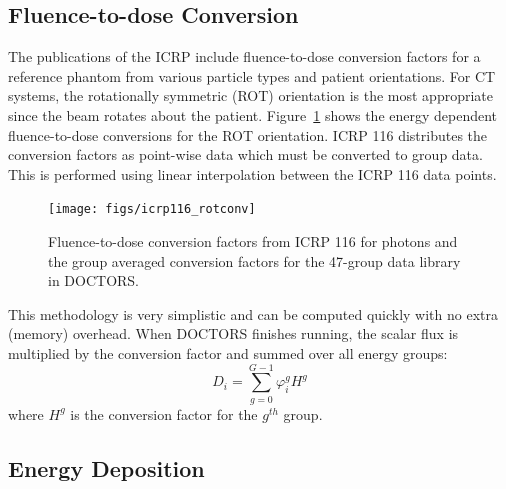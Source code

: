 \subsection{Fluence-to-dose Conversion}

The publications of the ICRP include fluence-to-dose conversion factors for a reference phantom from various particle types and patient orientations. For CT systems, the rotationally symmetric (ROT) orientation is the most appropriate since the beam rotates about the patient. Figure~\ref{fig:icrp116_rotconv} shows the energy dependent fluence-to-dose conversions for the ROT orientation. ICRP 116 distributes the conversion factors as point-wise data which must be converted to group data. This is performed using linear interpolation between the ICRP 116 data points.

\begin{figure}[tb]
  \begin{center}
   \texttt{[image: figs/icrp116\_rotconv]}
  \end{center}
  \caption{Fluence-to-dose conversion factors from ICRP 116 for photons and the group averaged conversion factors for the 47-group data library in DOCTORS.}
\label{fig:icrp116_rotconv}
\end{figure}

This methodology is very simplistic and can be computed quickly with no extra (memory) overhead. When DOCTORS finishes running, the scalar flux is multiplied by the conversion factor and summed over all energy groups:
\begin{equation}\label{eq:doseicrp}
D_i = \sum_{g=0}^{G-1} \varphi_i^g H^g
\end{equation}
where $H^g$ is the conversion factor for the $g^{th}$ group.

\subsection{Energy Deposition}

